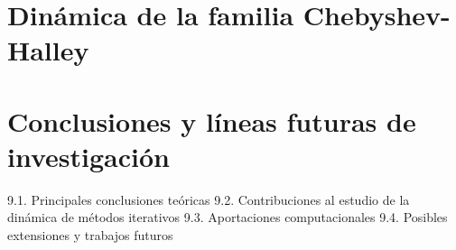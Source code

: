 \documentclass[12pt,a4paper,spanish]{book}
\theoremstyle{plain}
\theoremstyle{definition}
\theoremstyle{remark}
\begin{document}
\chapter{Dinámica de la familia Chebyshev-Halley}

%
%

%
% 


\chapter{Conclusiones y líneas futuras de investigación}

9.1. Principales conclusiones teóricas
9.2. Contribuciones al estudio de la dinámica de métodos iterativos
9.3. Aportaciones computacionales
9.4. Posibles extensiones y trabajos futuros
\end{document}
